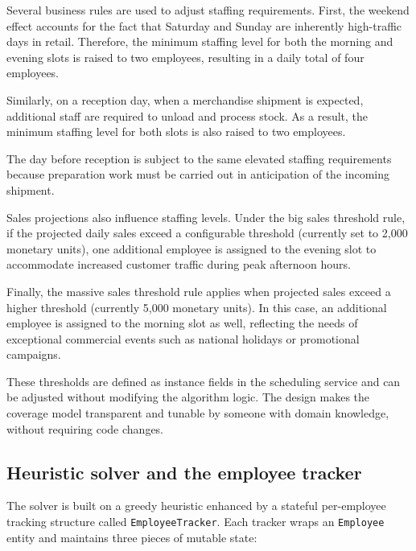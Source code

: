 Several business rules are used to adjust staffing requirements. First, the weekend effect accounts for the fact that Saturday and Sunday are inherently high-traffic days in retail. Therefore, the minimum staffing level for both the morning and evening slots is raised to two employees, resulting in a daily total of four employees.

Similarly, on a reception day, when a merchandise shipment is expected, additional staff are required to unload and process stock. As a result, the minimum staffing level for both slots is also raised to two employees.

The day before reception is subject to the same elevated staffing requirements because preparation work must be carried out in anticipation of the incoming shipment.

Sales projections also influence staffing levels. Under the big sales threshold rule, if the projected daily sales exceed a configurable threshold (currently set to 2,000 monetary units), one additional employee is assigned to the evening slot to accommodate increased customer traffic during peak afternoon hours.

Finally, the massive sales threshold rule applies when projected sales exceed a higher threshold (currently 5,000 monetary units). In this case, an additional employee is assigned to the morning slot as well, reflecting the needs of exceptional commercial events such as national holidays or promotional campaigns.

\par These thresholds are defined as instance fields in the scheduling service and can be adjusted without modifying the algorithm logic. The design makes the coverage model transparent and tunable by someone with domain knowledge, without requiring code changes.

\subsection{Heuristic solver and the employee tracker}
\par The solver is built on a greedy heuristic enhanced by a stateful per-employee tracking structure called \texttt{EmployeeTracker}. Each tracker wraps an \texttt{Employee} entity and maintains three pieces of mutable state:

